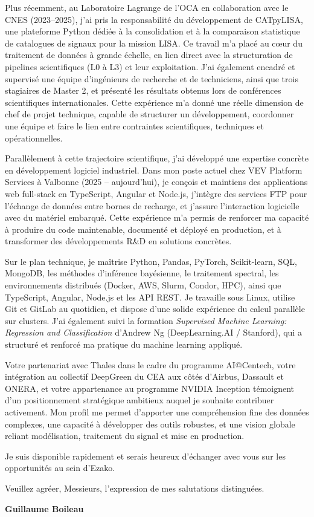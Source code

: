 \documentclass[11pt,a4paper]{../_shared/altacv}
\begin{document}
{Plus récemment, au Laboratoire Lagrange de l’OCA en collaboration avec le CNES (2023--2025), j’ai pris la responsabilité du développement de CATpyLISA, une plateforme Python dédiée à la consolidation et à la comparaison statistique de catalogues de signaux pour la mission LISA. Ce travail m’a placé au cœur du traitement de données à grande échelle, en lien direct avec la structuration de pipelines scientifiques (L0 à L3) et leur exploitation. J’ai également encadré et supervisé une équipe d’ingénieurs de recherche et de techniciens, ainsi que trois stagiaires de Master 2, et présenté les résultats obtenus lors de conférences scientifiques internationales. Cette expérience m’a donné une réelle dimension de chef de projet technique, capable de structurer un développement, coordonner une équipe et faire le lien entre contraintes scientifiques, techniques et opérationnelles.

Parallèlement à cette trajectoire scientifique, j’ai développé une expertise concrète en développement logiciel industriel. Dans mon poste actuel chez VEV Platform Services à Valbonne (2025 -- aujourd’hui), je conçois et maintiens des applications web full-stack en TypeScript, Angular et Node.js, j’intègre des services FTP pour l’échange de données entre bornes de recharge, et j’assure l’interaction logicielle avec du matériel embarqué. Cette expérience m’a permis de renforcer ma capacité à produire du code maintenable, documenté et déployé en production, et à transformer des développements R\&D en solutions concrètes.

Sur le plan technique, je maîtrise Python, Pandas, PyTorch, Scikit-learn, SQL, MongoDB, les méthodes d’inférence bayésienne, le traitement spectral, les environnements distribués (Docker, AWS, Slurm, Condor, HPC), ainsi que TypeScript, Angular, Node.js et les API REST. Je travaille sous Linux, utilise Git et GitLab au quotidien, et dispose d’une solide expérience du calcul parallèle sur clusters. J’ai également suivi la formation \textit{Supervised Machine Learning: Regression and Classification} d’Andrew Ng (DeepLearning.AI / Stanford), qui a structuré et renforcé ma pratique du machine learning appliqué.

Votre partenariat avec Thales dans le cadre du programme AI@Centech, votre intégration au collectif DeepGreen du CEA aux côtés d’Airbus, Dassault et ONERA, et votre appartenance au programme NVIDIA Inception témoignent d’un positionnement stratégique ambitieux auquel je souhaite contribuer activement. Mon profil me permet d’apporter une compréhension fine des données complexes, une capacité à développer des outils robustes, et une vision globale reliant modélisation, traitement du signal et mise en production.

Je suis disponible rapidement et serais heureux d’échanger avec vous sur les opportunités au sein d’Ezako.

Veuillez agréer, Messieurs, l’expression de mes salutations distinguées.

\textbf{Guillaume Boileau}

}
\end{document}
